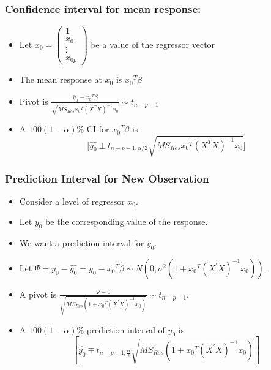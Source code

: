 \documentclass[10pt]{beamer} %
\begin{document}
\begin{frame}
   \frametitle{Confidence interval for mean response: }
   \begin{itemize}
      \item  Let ${x_0} = \begin{pmatrix}
            1 \\ x_{01} \\ \vdots \\ x_{0p}
         \end{pmatrix}$ be a value of the regressor vector
      \item The mean response at
         ${x_0}$ is ${x_0}^T\beta$ 
         \vspace{0.2cm}		
      \item Pivot is
      $ \frac{\hat{y}_0- {x_0}^T{\beta}}{\sqrt{MS_{Res} {x_0}^T
         (X^TX)^{-1} {x_0}} } \sim t_{n-p-1}$
         \vspace{0.2cm}
      \item A $100(1-\alpha)\%$ CI for  ${x_0}^T {\beta}$ is 
         $$\Bigg[{\hat{y_0}} \pm t_{n-p-1, \alpha/2} \sqrt{MS_{Res}
         {x_0}^T (X^TX)^{-1} {x_0}} \Bigg] $$
   \end{itemize}	
\end{frame}

\begin{frame}
   \frametitle{Prediction Interval for New Observation}
   \begin{itemize}
      \item Consider a level of regressor $x_0$. 
         \vspace{0.25cm}
      \item Let $y_0$ be the corresponding value of the response.
         \vspace{0.25cm}
      \item We want a prediction interval for $y_0$.
         \vspace{0.25cm}
      \item Let $\Psi =
         y_0-\hat{y_0}=y_0-{x_0}^{T}\hat{{\beta}} \sim
         N(0,\sigma^2(1+{x_0}^{T}(X^{'}X)^{-1}{x_0})).$
         \vspace{0.25cm}
      \item A pivot is
         $\frac{\Psi-0}{\sqrt{MS_{Res}(1+{x_0}^{T}(X^{'}X)^{-1}{x_0})}}
         \sim t_{n-p-1}.$
         \vspace{0.25cm}
      \item A $100(1-\alpha)\%$ prediction interval of $y_0$ is
         $$\left[ \hat{y_0} \mp
         t_{n-p-1;\frac{\alpha}{2}}\sqrt{MS_{Res}(1+{x_0}^{T}(X^{'}X)^{-1}{x_0})}
         \right]$$
   \end{itemize}
\end{frame}
\end{document}
